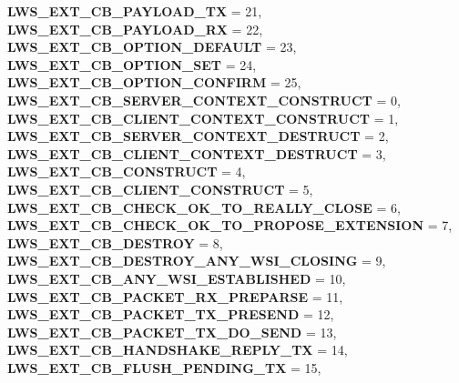 \begin{DoxyCompactItemize}
{\bfseries L\+W\+S\+\_\+\+E\+X\+T\+\_\+\+C\+B\+\_\+\+P\+A\+Y\+L\+O\+A\+D\+\_\+\+TX} = 21, 
\newline
{\bfseries L\+W\+S\+\_\+\+E\+X\+T\+\_\+\+C\+B\+\_\+\+P\+A\+Y\+L\+O\+A\+D\+\_\+\+RX} = 22, 
{\bfseries L\+W\+S\+\_\+\+E\+X\+T\+\_\+\+C\+B\+\_\+\+O\+P\+T\+I\+O\+N\+\_\+\+D\+E\+F\+A\+U\+LT} = 23, 
{\bfseries L\+W\+S\+\_\+\+E\+X\+T\+\_\+\+C\+B\+\_\+\+O\+P\+T\+I\+O\+N\+\_\+\+S\+ET} = 24, 
{\bfseries L\+W\+S\+\_\+\+E\+X\+T\+\_\+\+C\+B\+\_\+\+O\+P\+T\+I\+O\+N\+\_\+\+C\+O\+N\+F\+I\+RM} = 25, 
\newline
{\bfseries L\+W\+S\+\_\+\+E\+X\+T\+\_\+\+C\+B\+\_\+\+S\+E\+R\+V\+E\+R\+\_\+\+C\+O\+N\+T\+E\+X\+T\+\_\+\+C\+O\+N\+S\+T\+R\+U\+CT} = 0, 
{\bfseries L\+W\+S\+\_\+\+E\+X\+T\+\_\+\+C\+B\+\_\+\+C\+L\+I\+E\+N\+T\+\_\+\+C\+O\+N\+T\+E\+X\+T\+\_\+\+C\+O\+N\+S\+T\+R\+U\+CT} = 1, 
{\bfseries L\+W\+S\+\_\+\+E\+X\+T\+\_\+\+C\+B\+\_\+\+S\+E\+R\+V\+E\+R\+\_\+\+C\+O\+N\+T\+E\+X\+T\+\_\+\+D\+E\+S\+T\+R\+U\+CT} = 2, 
{\bfseries L\+W\+S\+\_\+\+E\+X\+T\+\_\+\+C\+B\+\_\+\+C\+L\+I\+E\+N\+T\+\_\+\+C\+O\+N\+T\+E\+X\+T\+\_\+\+D\+E\+S\+T\+R\+U\+CT} = 3, 
\newline
{\bfseries L\+W\+S\+\_\+\+E\+X\+T\+\_\+\+C\+B\+\_\+\+C\+O\+N\+S\+T\+R\+U\+CT} = 4, 
{\bfseries L\+W\+S\+\_\+\+E\+X\+T\+\_\+\+C\+B\+\_\+\+C\+L\+I\+E\+N\+T\+\_\+\+C\+O\+N\+S\+T\+R\+U\+CT} = 5, 
{\bfseries L\+W\+S\+\_\+\+E\+X\+T\+\_\+\+C\+B\+\_\+\+C\+H\+E\+C\+K\+\_\+\+O\+K\+\_\+\+T\+O\+\_\+\+R\+E\+A\+L\+L\+Y\+\_\+\+C\+L\+O\+SE} = 6, 
{\bfseries L\+W\+S\+\_\+\+E\+X\+T\+\_\+\+C\+B\+\_\+\+C\+H\+E\+C\+K\+\_\+\+O\+K\+\_\+\+T\+O\+\_\+\+P\+R\+O\+P\+O\+S\+E\+\_\+\+E\+X\+T\+E\+N\+S\+I\+ON} = 7, 
\newline
{\bfseries L\+W\+S\+\_\+\+E\+X\+T\+\_\+\+C\+B\+\_\+\+D\+E\+S\+T\+R\+OY} = 8, 
{\bfseries L\+W\+S\+\_\+\+E\+X\+T\+\_\+\+C\+B\+\_\+\+D\+E\+S\+T\+R\+O\+Y\+\_\+\+A\+N\+Y\+\_\+\+W\+S\+I\+\_\+\+C\+L\+O\+S\+I\+NG} = 9, 
{\bfseries L\+W\+S\+\_\+\+E\+X\+T\+\_\+\+C\+B\+\_\+\+A\+N\+Y\+\_\+\+W\+S\+I\+\_\+\+E\+S\+T\+A\+B\+L\+I\+S\+H\+ED} = 10, 
{\bfseries L\+W\+S\+\_\+\+E\+X\+T\+\_\+\+C\+B\+\_\+\+P\+A\+C\+K\+E\+T\+\_\+\+R\+X\+\_\+\+P\+R\+E\+P\+A\+R\+SE} = 11, 
\newline
{\bfseries L\+W\+S\+\_\+\+E\+X\+T\+\_\+\+C\+B\+\_\+\+P\+A\+C\+K\+E\+T\+\_\+\+T\+X\+\_\+\+P\+R\+E\+S\+E\+ND} = 12, 
{\bfseries L\+W\+S\+\_\+\+E\+X\+T\+\_\+\+C\+B\+\_\+\+P\+A\+C\+K\+E\+T\+\_\+\+T\+X\+\_\+\+D\+O\+\_\+\+S\+E\+ND} = 13, 
{\bfseries L\+W\+S\+\_\+\+E\+X\+T\+\_\+\+C\+B\+\_\+\+H\+A\+N\+D\+S\+H\+A\+K\+E\+\_\+\+R\+E\+P\+L\+Y\+\_\+\+TX} = 14, 
{\bfseries L\+W\+S\+\_\+\+E\+X\+T\+\_\+\+C\+B\+\_\+\+F\+L\+U\+S\+H\+\_\+\+P\+E\+N\+D\+I\+N\+G\+\_\+\+TX} = 15, 

\end{DoxyCompactItemize}

